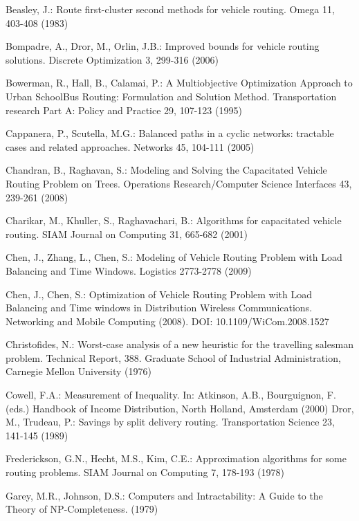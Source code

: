 \begin{thebibliography}{}
  Beasley, J.: Route first-cluster second methods for vehicle routing. Omega 11, 403-408 (1983)
 
 Bompadre, A., Dror, M., Orlin, J.B.: Improved bounds for vehicle routing solutions. Discrete Optimization 3, 299-316 (2006)

 Bowerman, R., Hall, B., Calamai, P.: A Multiobjective Optimization Approach to Urban SchoolBus Routing: Formulation and Solution Method. Transportation research Part A: Policy and Practice 29, 107-123 (1995)
 
 Cappanera, P., Scutella, M.G.: Balanced paths in a cyclic networks: tractable cases and related approaches. Networks 45, 104-111 (2005) 
  
 Chandran, B., Raghavan, S.: Modeling and Solving the Capacitated Vehicle Routing Problem on Trees. Operations Research/Computer Science Interfaces 43, 239-261 (2008)
 
 Charikar, M., Khuller, S., Raghavachari, B.: Algorithms for capacitated vehicle routing. SIAM Journal on Computing 31, 665-682 (2001)  

  Chen, J., Zhang, L., Chen, S.: Modeling of Vehicle Routing Problem with Load Balancing and Time Windows. Logistics 2773-2778 (2009)
  
 Chen, J., Chen, S.: Optimization of Vehicle Routing Problem with Load Balancing and Time windows in Distribution Wireless Communications. Networking and Mobile Computing (2008). DOI: 10.1109/WiCom.2008.1527

 Christofides, N.: Worst-case analysis of a new heuristic for the travelling salesman problem. Technical Report, 388. Graduate School of Industrial Administration, Carnegie Mellon University (1976) 

  Cowell, F.A.: Measurement of Inequality. In: Atkinson, A.B., Bourguignon, F. (eds.) Handbook of Income Distribution, North Holland, Amsterdam (2000) 
  Dror, M., Trudeau, P.: Savings by split delivery routing. Transportation Science 23, 141-145 (1989) 

 Frederickson, G.N., Hecht, M.S., Kim, C.E.: Approximation algorithms for some routing problems. SIAM Journal on Computing 7, 178-193 (1978) 
 
 Garey, M.R., Johnson, D.S.: Computers and Intractability: A Guide to the Theory of NP-Completeness. (1979) 


\end{thebibliography}
